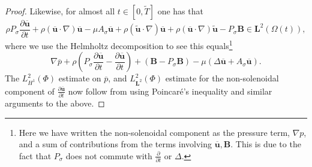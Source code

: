 \documentclass[10pt,a4paper]{amsart}
\newcommand{\ddt}[1]{\frac{\partial #1}{\partial t}}
\newcommand{\grad}{\nabla}
\newcommand{\mbf}[1]{\mathbf{#1}}
\begin{document}
\begin{proof}
	Likewise, for almost all $t \in [0,\widetilde{T}]$ one has that 
     \[\rho P_\sigma \ddt{\overline{\mbf{u}}} + \rho(\overline{\mbf{u}} \cdot \grad) \overline{\mbf{u}} - \mu A_{\sigma} \overline{\mbf{u}} + \rho (\widetilde{\mbf{u}} \cdot \grad)\overline{\mbf{u}} + \rho(\overline{\mbf{u}} \cdot \grad) \widetilde{\mbf{u}} - P_\sigma \mbf{B} \in \mbf{L}^2(\Omega(t)),\]
    where we use the Helmholtz decomposition to see this equals\footnote{Here we have written the non-solenoidal component as the pressure term, $\grad p$, and a sum of contributions from the terms involving $\overline{\mbf{u}}, \mbf{B}$.
    This is due to the fact that $P_\sigma$ does not commute with $\ddt{}$ or $\Delta$.}
    \[\grad \overline{p} + \rho\left(P_\sigma \ddt{\overline{\mbf{u}}} - \ddt{\overline{\mbf{u}}}\right) + (\mbf{B} - P_\sigma\mbf{B}) - \mu(\Delta \overline{\mbf{u}} + A_{\sigma}\overline{\mbf{u}}).\]
	The $L^2_{H^1}(\Phi)$ estimate on $\overline{p}$, and $L^2_{\mbf{L}^2}(\Phi)$ estimate for the non-solenoidal component of $\ddt{\overline{\mbf{u}}}$ now follow from using Poincar\'e's inequality and similar arguments to the above.
\end{proof}
\end{document}
